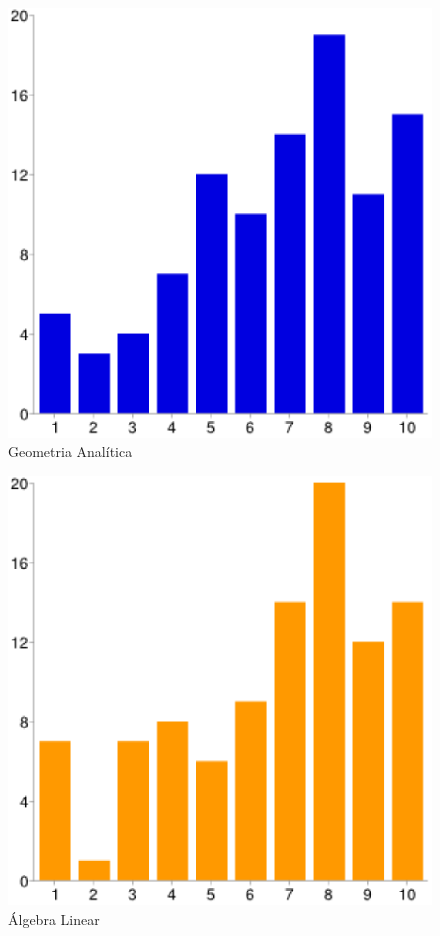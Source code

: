 \documentclass[12pt,a4paper]{article}
\begin{document}
\begin{figure}[htb]
	\center
	\includegraphics[scale=0.36]{imagens/7.eps}
	\caption{Geometria Analítica}
	\label{fig:grafGA}
\end{figure}

\begin{figure}[htb]
	\center
	\includegraphics[scale=0.36]{imagens/8.eps} 
	\caption{Álgebra Linear}
	\label{fig:grafAlgebra}
\end{figure}
\end{document}
